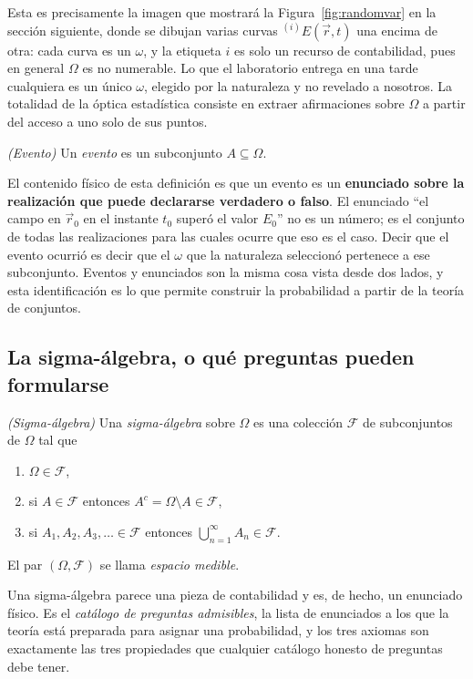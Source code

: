 		Esta es precisamente la imagen que mostrará la Figura~\ref{fig:randomvar} en la sección siguiente, donde se dibujan varias curvas $^{(i)}E(\vec{r},t)$ una encima de otra: cada curva es un $\omega$, y la etiqueta $i$ es solo un recurso de contabilidad, pues en general $\Omega$ es no numerable. Lo que el laboratorio entrega en una tarde cualquiera es un único $\omega$, elegido por la naturaleza y no revelado a nosotros. La totalidad de la óptica estadística consiste en extraer afirmaciones sobre $\Omega$ a partir del acceso a uno solo de sus puntos.

		\begin{myDef}
			\textit{(Evento)} Un \textit{evento} es un subconjunto $A\subseteq\Omega$.
		\end{myDef}

		El contenido físico de esta definición es que un evento es un \textbf{enunciado sobre la realización que puede declararse verdadero o falso}. El enunciado ``el campo en $\vec{r}_{0}$ en el instante $t_{0}$ superó el valor $E_{0}$'' no es un número; es el conjunto de todas las realizaciones para las cuales ocurre que eso es el caso. Decir que el evento ocurrió es decir que el $\omega$ que la naturaleza seleccionó pertenece a ese subconjunto. Eventos y enunciados son la misma cosa vista desde dos lados, y esta identificación es lo que permite construir la probabilidad a partir de la teoría de conjuntos.

	\subsection{La sigma-álgebra, o qué preguntas pueden formularse}

		\begin{myDef}
			\textit{(Sigma-álgebra)} Una \textit{sigma-álgebra} sobre $\Omega$ es una colección $\mathcal{F}$ de subconjuntos de $\Omega$ tal que
			\begin{enumerate}
				\item $\Omega\in\mathcal{F}$,
				\item si $A\in\mathcal{F}$ entonces $A^{c} = \Omega\setminus A\in\mathcal{F}$,
				\item si $A_{1},A_{2},A_{3},\dots\in\mathcal{F}$ entonces $\bigcup_{n=1}^{\infty}A_{n}\in\mathcal{F}$.
			\end{enumerate}
			El par $(\Omega,\mathcal{F})$ se llama \textit{espacio medible}.
		\end{myDef}

		Una sigma-álgebra parece una pieza de contabilidad y es, de hecho, un enunciado físico. Es el \textit{catálogo de preguntas admisibles}, la lista de enunciados a los que la teoría está preparada para asignar una probabilidad, y los tres axiomas son exactamente las tres propiedades que cualquier catálogo honesto de preguntas debe tener.

